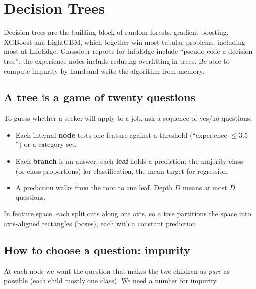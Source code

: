 \chapter{Decision Trees}

Decision trees are the building block of random forests, gradient boosting, XGBoost and LightGBM, which together win
most tabular problems, including most at InfoEdge. Glassdoor reports for InfoEdge include ``pseudo-code a decision
tree''; the experience notes include reducing overfitting in trees. Be able to compute impurity by hand and write the
algorithm from memory.

\section{A tree is a game of twenty questions}
To guess whether a seeker will apply to a job, ask a sequence of yes/no questions:
\begin{center}
\end{center}
\begin{itemize}
\item Each internal \textbf{node} tests one feature against a threshold (``experience $\le 3.5$'') or a category set.
\item Each \textbf{branch} is an answer; each \textbf{leaf} holds a prediction: the majority class (or class proportions)
  for classification, the mean target for regression.
\item A prediction walks from the root to one leaf. Depth $D$ means at most $D$ questions.
\end{itemize}
In feature space, each split cuts along one axis, so a tree partitions the space into axis-aligned rectangles (boxes),
each with a constant prediction.

\section{How to choose a question: impurity}
At each node we want the question that makes the two children as \emph{pure} as possible (each child mostly one class).
We need a number for impurity.

